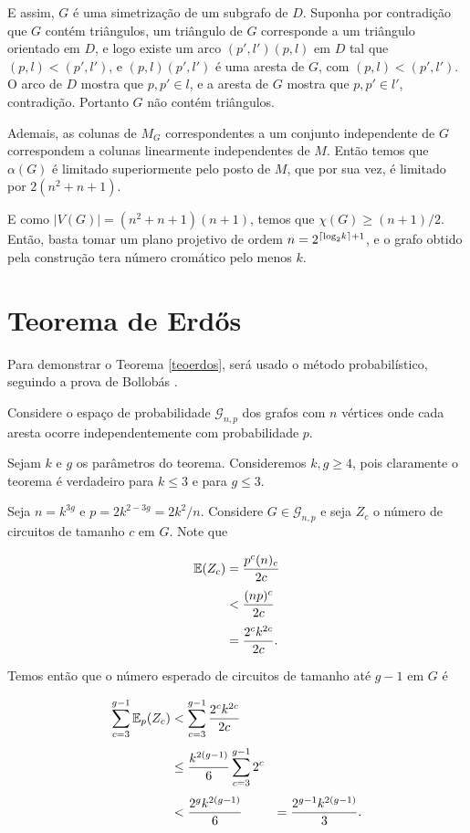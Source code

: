 E assim, $G$ é uma simetrização de um subgrafo de $D$. Suponha por contradição que $G$ contém triângulos, um triângulo de $G$ corresponde a um triângulo orientado em $D$, e logo existe um arco $(p',l')(p,l)$ em $D$ tal que $(p,l) < (p',l')$, e $(p,l)(p',l')$ é uma aresta de $G$, com $(p,l) < (p',l')$. O arco de $D$ mostra que $p,p' \in l$, e a aresta de $G$ mostra que $p,p' \in l'$, contradição. Portanto $G$ não contém triângulos.

Ademais, as colunas de $M_G$ correspondentes a um conjunto independente de $G$ correspondem a colunas linearmente independentes de $M$. Então temos que $\alpha(G)$ é limitado superiormente pelo posto de $M$, que por sua vez, é limitado por $2(n^2+n+1)$.

E como $|V(G)| = (n^2+n+1)(n+1)$, temos que $\chi(G) \geq (n+1)/2$. Então, basta tomar um plano projetivo de ordem $n = 2^{\ceil*{\text{log}_2 k}+1}$, e o grafo obtido pela construção tera número cromático pelo menos $k$.


\section{Teorema de Erd\H{o}s}

Para demonstrar o Teorema \ref{teoerdos}, será usado o método probabilístico, seguindo a prova de Bollobás \cite{bollobas2013modern}.

Considere o espaço de probabilidade $\mathcal{G}_{n,p}$ dos grafos com $n$ vértices onde cada aresta ocorre independentemente com probabilidade $p$.

Sejam $k$ e $g$ os parâmetros do teorema. Consideremos $k,g \geq 4$, pois claramente o teorema é verdadeiro para $k \leq 3$ e para $g \leq 3$. 

Seja $n = k^{3g}$ e $p = 2k^{2-3g} = 2k^2/n$. Considere $G \in\mathcal{G}_{n,p}$ e seja $Z_c$ o número de circuitos de tamanho $c$ em $G$. Note que

\begin{equation*}
\setlength{\jot}{6pt}
\begin{aligned}
\bbe(Z_c) &= \frac{p^c(n)_c}{2c} \\
&< \frac{(np)^c}{2c} \\
&= \frac{2^ck^{2c}}{2c}.
\end{aligned}
\end{equation*}

Temos então que o número esperado de circuitos de tamanho até $g-1$ em $G$ é

\begin{equation*}
\setlength{\jot}{6pt}
\begin{aligned}
\sum\limits_{c=3}^{g-1}\bbe_p(Z_c) &< \sum\limits_{c=3}^{g-1}\frac{2^ck^{2c}}{2c} \\
&\leq \frac{k^{2(g-1)}}{6}\sum\limits_{c=3}^{g-1}2^c \\
&< \frac{2^gk^{2(g-1)}}{6} &= \frac{2^{g-1}k^{2(g-1)}}{3}.
\end{aligned}
\end{equation*}

